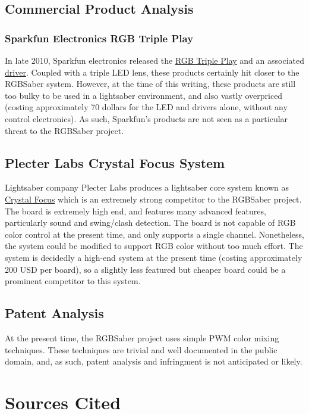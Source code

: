 \documentclass[12pt,letterpaper,onecolumn]{article}
\begin{document}
\subsection[Commercial]{Commercial Product Analysis}
\subsubsection[Sparkfun]{Sparkfun Electronics RGB Triple Play}
In late 2010, Sparkfun electronics released the \href{http://www.sparkfun.com/products/9738}{RGB Triple Play} and an associated \href{http://www.sparkfun.com/products/9834}{driver}.
Coupled with a triple LED lens, these products certainly hit closer to the RGBSaber system. However, at the
time of this writing, these products are still too bulky to be used in a lightsaber environment, and also vastly
overpriced (costing approximately 70 dollars for the LED and drivers alone, without any control electronics).
As such, Sparkfun's products are not seen as a particular threat to the RGBSaber project.

\subsection[Plecter Labs]{Plecter Labs Crystal Focus System}
Lightsaber company Plecter Labs produces a lightsaber core system known as \href{http://www.plecterlabs.com/catalog/product_info.php?cPath=23&products_id=149}{Crystal Focus}
which is an extremely strong competitor to the RGBSaber project. The board is extremely high end, and 
features many advanced features, particularly sound and swing/clash detection.  The board is not capable
of RGB color control at the present time, and only supports a single channel. Nonetheless, the system
could be modified to support RGB color without too much effort. The system is decidedly a high-end
system at the present time (costing approximately 200 USD per board), so a slightly less featured but
cheaper board could be a prominent competitor to this system.

\subsection[Patent]{Patent Analysis}
At the present time, the RGBSaber project uses simple PWM color mixing techniques. These techniques are
trivial and well documented in the public domain, and, as such, patent analysis and infringment is not
anticipated or likely.

\section[Sources Cited]{Sources Cited}
\end{document}
